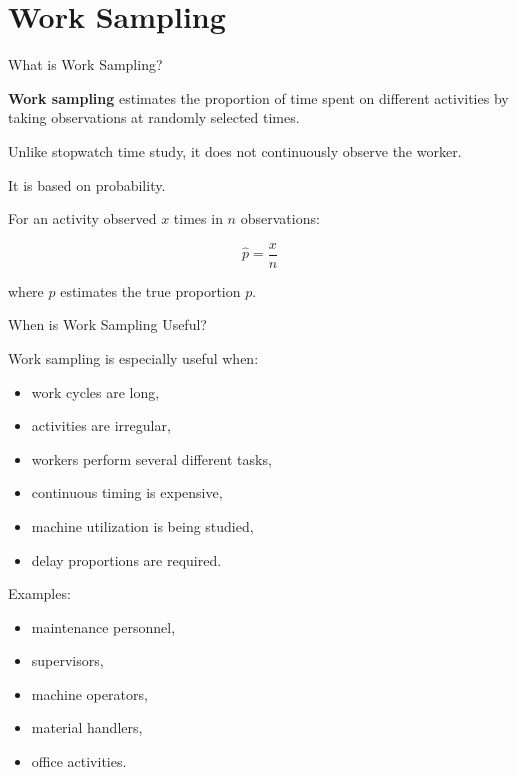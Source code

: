 \documentclass[aspectratio=169,10pt]{beamer}
\begin{document}

\section{Work Sampling}

\begin{frame}[shrink=18]{What is Work Sampling?}
\small

\textbf{Work sampling} estimates the proportion of time spent on
different activities by taking observations at randomly selected
times.

Unlike stopwatch time study, it does not continuously observe the
worker.

\vspace{5pt}

It is based on probability.

For an activity observed \(x\) times in \(n\) observations:

\[
\boxed{
\hat p=\frac{x}{n}
}
\]

where \(\hat p\) estimates the true proportion \(p\).

\end{frame}


\begin{frame}[shrink=18]{When is Work Sampling Useful?}
\small

Work sampling is especially useful when:

\begin{itemize}
    \item work cycles are long,
    \item activities are irregular,
    \item workers perform several different tasks,
    \item continuous timing is expensive,
    \item machine utilization is being studied,
    \item delay proportions are required.
\end{itemize}

Examples:

\begin{itemize}
    \item maintenance personnel,
    \item supervisors,
    \item machine operators,
    \item material handlers,
    \item office activities.
\end{itemize}

\end{frame}
\end{document}

